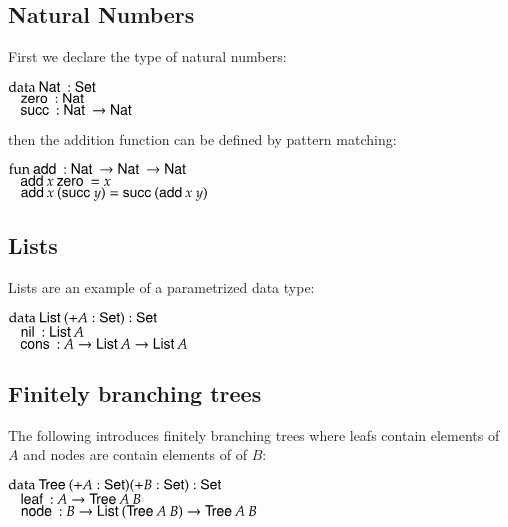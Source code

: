 \subsection{Natural Numbers}
First we declare the type of natural numbers:
\begin{bsp}
$\data \Nat : \Set$ \\
$\spc \zero : \Nat $\\
$\spc \suc : \Nat \ra \Nat$
\end{bsp}
then the addition function can be defined by pattern matching:
\begin{bsp}
$\fun \add : \Nat \ra \Nat \ra \Nat$\\
$\spc \add x \: \zero = x $\\
$\spc \add x \: (\suc y) = \suc (\add x \: y)  $
\end{bsp}
\subsection{Lists}
Lists are an example of a parametrized data type:
\begin{bsp}
$\data \List ( + A : \Set ) : \Set $ \\
$ \spc \nil : \List A  $\\
$ \spc \cons : A \ra \List A \ra \List A $
\end{bsp}
\subsection{Finitely branching trees}
\label{tre}
The following introduces finitely branching trees where leafs contain elements of $A$ and nodes are contain elements of of $B$:
\begin{bsp}
$\data \Tree ( + A : \Set ) ( + B : \Set ) : \Set $ \\
$ \spc \leaf : A \ra \Tree A \: B $\\
$ \spc \node : B \ra \List (\Tree A \: B) \ra \Tree A \: B $
\end{bsp}

